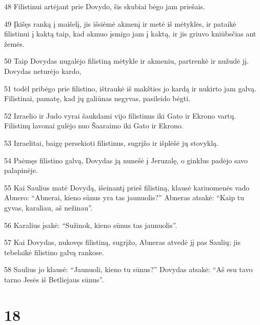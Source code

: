 \par 48 Filistinui artėjant prie Dovydo, šis skubiai bėgo jam priešais. 
\par 49 Įkišęs ranką į maišelį, jis išsiėmė akmenį ir metė iš mėtyklės, ir pataikė filistinui į kaktą taip, kad akmuo įsmigo jam į kaktą, ir jis griuvo kniūbsčias ant žemės. 
\par 50 Taip Dovydas nugalėjo filistiną mėtykle ir akmeniu, partrenkė ir nužudė jį. Dovydas neturėjo kardo, 
\par 51 todėl pribėgo prie filistino, ištraukė iš makšties jo kardą ir nukirto jam galvą. Filistinai, pamatę, kad jų galiūnas negyvas, pasileido bėgti. 
\par 52 Izraelio ir Judo vyrai šaukdami vijo filistinus iki Gato ir Ekrono vartų. Filistinų lavonai gulėjo nuo Šaaraimo iki Gato ir Ekrono. 
\par 53 Izraelitai, baigę persekioti filistinus, sugrįžo ir išplėšė jų stovyklą. 
\par 54 Paėmęs filistino galvą, Dovydas ją nunešė į Jeruzalę, o ginklus padėjo savo palapinėje. 
\par 55 Kai Saulius matė Dovydą, išeinantį prieš filistiną, klausė kariuomenės vado Abnero: “Abnerai, kieno sūnus yra tas jaunuolis?” Abneras atsakė: “Kaip tu gyvas, karaliau, aš nežinau”. 
\par 56 Karalius įsakė: “Sužinok, kieno sūnus tas jaunuolis”. 
\par 57 Kai Dovydas, nukovęs filistiną, sugrįžo, Abneras atvedė jį pas Saulių; jis tebelaikė filistino galvą rankose. 
\par 58 Saulius jo klausė: “Jaunuoli, kieno tu sūnus?” Dovydas atsakė: “Aš esu tavo tarno Jesės iš Betliejaus sūnus”.



\chapter{18}


